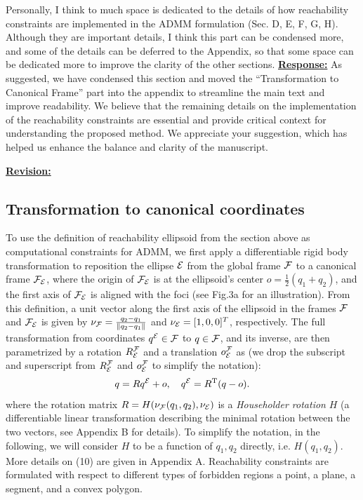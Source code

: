\documentclass{article}
\newcommand{\rv}{{\large{\underline{\textbf{Revision:}}}}\quad}
\newcommand{\news}{\color{blue}}
\begin{document}
\begin{cmt}{}{}
	Personally, I think to much space is dedicated to the details of how
	reachability constraints are implemented in the ADMM formulation (Sec.
	D, E, F, G, H). Although they are important details, I think this part
	can be condensed more, and some of the details can be deferred to the
	Appendix, so that some space can be dedicated more to improve the
	clarity of the other sections.
	\tcblower
	\underline{\textbf{Response:}} As suggested, we have condensed this section and moved the “Transformation to Canonical Frame” part into the appendix to streamline the main text and improve readability. We believe that the remaining details on the implementation of the reachability constraints are essential and provide critical context for understanding the proposed method. We appreciate your suggestion, which has helped us enhance the balance and clarity of the manuscript. 
\end{cmt}
\rv
\renewcommand\thesubsection{D}
 \subsection{Transformation to canonical coordinates}\label{sec:rotation2Standard}
{\news	\newcommand{\oFE}{o}
 To use the definition of reachability ellipsoid from the section above as computational constraints for ADMM, we first apply a differentiable rigid body transformation to reposition the ellipse $\mathcal{E}$ from the global frame $\mathcal{F}$ to a canonical frame $\mathcal{F}_{\mathcal{E}}$, where the origin of $\mathcal{F}_{\mathcal{E}}$ is at the ellipsoid's center $\oFE = \frac{1}{2}(q_1+q_2)$, and the first axis of $\mathcal{F}_{\mathcal{E}}$ is aligned with the foci (see Fig.3a for an illustration). 
From this definition, a unit vector along the first axis of the ellipsoid in the frames $\mathcal{F}$ and $\mathcal{F}_{\mathcal{E}}$ is given by $\nu_{\mathcal{F}} = \frac{q_2-q_1}{\lVert q_2-q_1\rVert}$ and $\nu_{\mathcal{E}} =[1,0,0]^T$, respectively.
The full transformation from coordinates $q^{\mathcal{E}}\in\mathcal{F}$ to $q\in\mathcal{F}$, and its inverse, are then parametrized by a rotation $R^{\mathcal{F}}_{\mathcal{E}}$ and a translation $o^{\mathcal{F}}_{\mathcal{E}}$ as (we drop the subscript and superscript from $R^{\mathcal{F}}_{\mathcal{E}}$ and $o^{\mathcal{F}}_{\mathcal{E}}$ to simplify the notation):
\setcounter{equation}{9}
\begin{equation}\label{eq:transformations}
  q=R\Eframe{q}+\oFE,\quad
  \Eframe{q}=R\transpose(q-\oFE).
\end{equation}
where the rotation matrix $R=H(\nu_{\mathcal{F}}(q_1,q_2),\nu_{\mathcal{E}})$ is a \emph{Householder rotation} $H$ (a differentiable linear transformation describing the minimal rotation between the two vectors, see Appendix B for details).  To simplify the notation, in the following, we will consider $H$ to be a function of $q_1,q_2$ directly, i.e. $H(q_1,q_2)$. More details on (10) are given in Appendix A.
  Reachability constraints are formulated with respect to different types of forbidden regions a point, a plane, a segment, and a convex polygon.}
\renewcommand\thesubsection{F}
\end{document}
